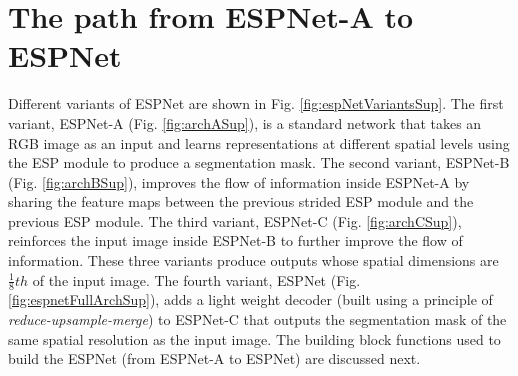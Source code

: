 \documentclass[runningheads]{llncs}
\def\Fig{Fig. }
\begin{document}
\section{The path from ESPNet-A to ESPNet}
\label{sec:detailsBlocks}
Different variants of ESPNet are shown in \Fig \ref{fig:espNetVariantsSup}. The first variant, ESPNet-A (\Fig \ref{fig:archASup}), is a standard network that takes an RGB image as an input and learns representations at different spatial levels using the ESP module to produce a segmentation mask. The second variant, ESPNet-B (\Fig \ref{fig:archBSup}), improves the flow of information inside ESPNet-A by sharing the feature maps between the previous strided ESP module and the previous ESP module. The third variant, ESPNet-C (\Fig \ref{fig:archCSup}), reinforces the input image inside ESPNet-B to further improve the flow of information. These three variants produce outputs whose spatial dimensions are $\frac{1}{8}{th}$ of the input image. The fourth variant, ESPNet (\Fig \ref{fig:espnetFullArchSup}), adds a light weight decoder (built using a principle of \textit{reduce-upsample-merge}) to ESPNet-C that outputs the segmentation mask of the same spatial resolution as the input image. The building block functions used to build the ESPNet (from ESPNet-A to ESPNet) are discussed next.
\end{document}
